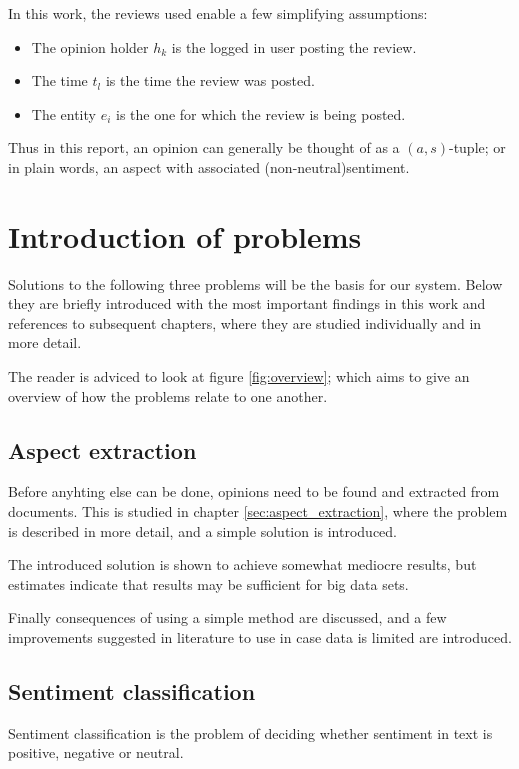 \documentclass[a4paper,11pt]{kth-mag}
\begin{document}
In this work, the reviews used enable a few simplifying assumptions:
\begin{itemize}
\item The opinion holder $h_k$ is the logged in user posting the review.
\item The time $t_l$ is the time the review was posted.
\item The entity $e_i$ is the one for which the review is being posted.
\end{itemize}

Thus in this report, an opinion can generally be thought of as a $(a,s)$-tuple; or in plain words, an aspect with associated (non-neutral)sentiment.
\vspace{4cm}

\pagebreak

\section{Introduction of problems}
Solutions to the following three problems will be the basis for our system.
Below they are briefly introduced with the most important findings in this work and references
to subsequent chapters, where they are studied individually and in more detail.

The reader is adviced to look at figure \ref{fig:overview}; which aims to
give an overview of how the problems relate to one another.

\subsection{Aspect extraction}
Before anyhting else can be done, opinions need to be found and extracted from documents.
This is studied in chapter \ref{sec:aspect_extraction}, where the problem is described in more detail,
and a simple solution is introduced.

The introduced solution is shown to achieve somewhat mediocre results, but estimates indicate
that results may be sufficient for big data sets.

Finally consequences of using a simple method are discussed, and a few improvements suggested in literature
to use in case data is limited are introduced.


\subsection{Sentiment classification}
Sentiment classification is the problem of deciding whether sentiment in text is positive, negative or neutral.
\end{document}
